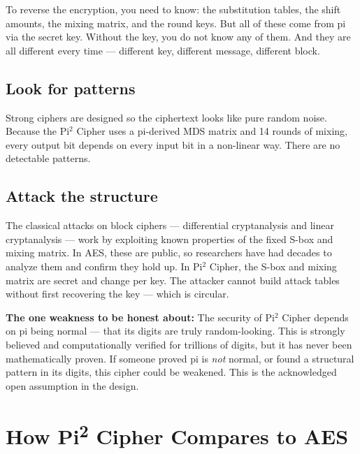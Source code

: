 \documentclass[12pt, a4paper]{article}
\begin{document}
To reverse the encryption, you need to know: the substitution tables, the shift amounts, the mixing matrix, and the round keys. But all of these come from pi via the secret key. Without the key, you do not know any of them. And they are all different every time --- different key, different message, different block.

\subsection{Look for patterns}

Strong ciphers are designed so the ciphertext looks like pure random noise. Because the Pi$^2$ Cipher uses a pi-derived MDS matrix and 14 rounds of mixing, every output bit depends on every input bit in a non-linear way. There are no detectable patterns.

\subsection{Attack the structure}

The classical attacks on block ciphers --- differential cryptanalysis and linear cryptanalysis --- work by exploiting known properties of the fixed S-box and mixing matrix. In AES, these are public, so researchers have had decades to analyze them and confirm they hold up. In Pi$^2$ Cipher, the S-box and mixing matrix are secret and change per key. The attacker cannot build attack tables without first recovering the key --- which is circular.

\begin{redbox}
\textbf{The one weakness to be honest about:} The security of Pi$^2$ Cipher depends on pi being normal --- that its digits are truly random-looking. This is strongly believed and computationally verified for trillions of digits, but it has never been mathematically proven. If someone proved pi is \textit{not} normal, or found a structural pattern in its digits, this cipher could be weakened. This is the acknowledged open assumption in the design.
\end{redbox}

\section{How Pi\textsuperscript{2} Cipher Compares to AES}

\vspace{0.5em}
\end{document}
